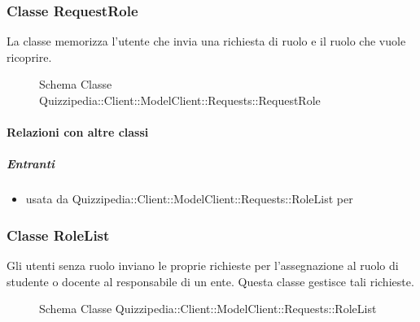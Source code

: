 \subsubsection{Classe RequestRole}
La classe memorizza l'utente che invia una richiesta di ruolo e il ruolo che vuole ricoprire.
\begin{figure}[H]
\centering
\noindent{}
\caption[Schema Classe RequestRole]{Schema Classe Quizzipedia::Client::ModelClient::Requests::RequestRole}
\end{figure}
\paragraph{Relazioni con altre classi}
\subparagraph{Entranti}
\begin{itemize}
\item usata da Quizzipedia::Client::ModelClient::Requests::RoleList per 
\end{itemize}
\subsubsection{Classe RoleList}
Gli utenti senza ruolo inviano le proprie richieste per l'assegnazione al ruolo di studente o docente al responsabile di un ente. Questa classe gestisce tali richieste.
\begin{figure}[H]
\centering
\noindent{}
\caption[Schema Classe RoleList]{Schema Classe Quizzipedia::Client::ModelClient::Requests::RoleList}
\end{figure}
